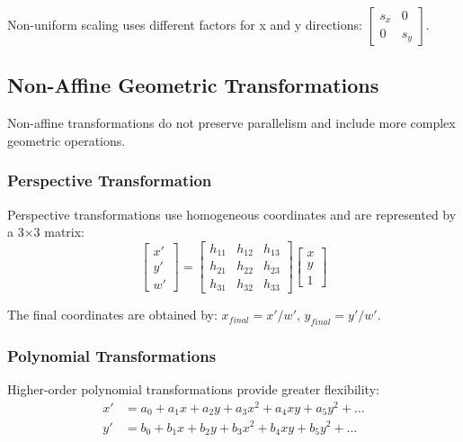 \documentclass[a4paper, journal]{IEEEtran}
\begin{document}
Non-uniform scaling uses different factors for x and y directions: $\begin{bmatrix} s_x & 0 \\ 0 & s_y \end{bmatrix}$.

\subsection{Non-Affine Geometric Transformations}
Non-affine transformations do not preserve parallelism and include more complex geometric operations.

\subsubsection{Perspective Transformation}
Perspective transformations use homogeneous coordinates and are represented by a 3×3 matrix:
\begin{equation}
    \begin{bmatrix} x' \\ y' \\ w' \end{bmatrix} = \begin{bmatrix} h_{11} & h_{12} & h_{13} \\ h_{21} & h_{22} & h_{23} \\ h_{31} & h_{32} & h_{33} \end{bmatrix} \begin{bmatrix} x \\ y \\ 1 \end{bmatrix}
\end{equation}

The final coordinates are obtained by: $x_{final} = x'/w'$, $y_{final} = y'/w'$.

\subsubsection{Polynomial Transformations}
Higher-order polynomial transformations provide greater flexibility:
\begin{equation}
    \begin{aligned}
        x' & = a_0 + a_1x + a_2y + a_3x^2 + a_4xy + a_5y^2 + \ldots \\
        y' & = b_0 + b_1x + b_2y + b_3x^2 + b_4xy + b_5y^2 + \ldots
    \end{aligned}
\end{equation}
\end{document}
